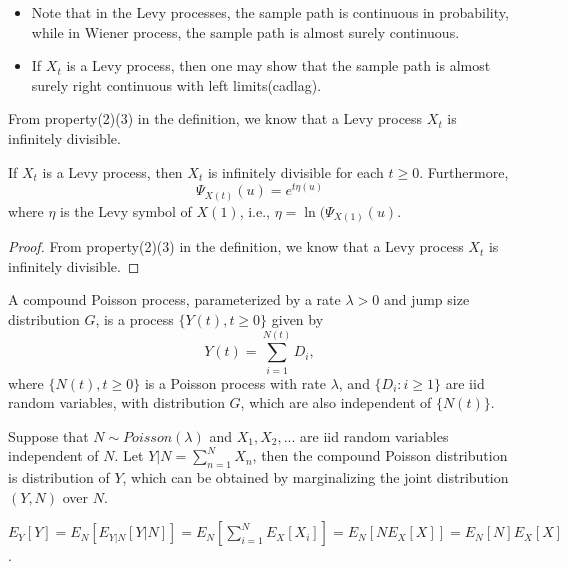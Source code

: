 \begin{refsection}
\begin{remark}\hfill
	\begin{itemize}
		\item Note that in the Levy processes, the sample path is continuous in probability, while in Wiener process, the sample path is almost surely continuous.
		\item If $X_t$ is a Levy process, then one may show that the sample path is almost surely right continuous with left limits(cadlag). 
	\end{itemize}
\end{remark}


\begin{remark}
	From property(2)(3) in the definition, we know that a Levy process $X_t$ is infinitely divisible.
\end{remark}

\begin{lemma}
	If $X_t$ is a Levy process, then $X_t$ is infinitely divisible for each $t\geq 0$. Furthermore,
	$$\Psi_{X(t)}(u) = e^{t\eta(u)}$$
	where $\eta$ is the Levy symbol of $X(1)$, i.e., $\eta = \ln(\Psi_{X(1)}(u)$.
\end{lemma}
\begin{proof}
	From property(2)(3) in the definition, we know that a Levy process $X_t$ is infinitely divisible.
\end{proof}


\begin{definition}
	A compound Poisson process, parameterized by a rate $\lambda > 0$ and jump size distribution $G$, is a process $\{Y(t),t\geq 0\}$ given by
	$$Y(t) = \sum_{i=1}^{N(t)} D_i,$$
	where $\{N(t),t\geq 0\}$ is a Poisson process with rate $\lambda$, and $\{D_i:i\geq 1\}$ are iid random variables, with distribution $G$, which are also independent of $\{N(t)\}$.
\end{definition}

\begin{definition}
	Suppose that 
	$N\sim Poisson(\lambda)$ and $X_1,X_2,...$ are iid random variables independent of $N$. Let $Y|N = \sum_{n=1}^N X_n$, then the compound Poisson distribution is distribution of $Y$, which can be obtained by marginalizing the joint distribution $(Y,N)$ over $N$. 
\end{definition}

\begin{lemma}
	$E_Y[Y] = E_N[E_{Y|N}[Y|N]] = E_N[\sum_{i=1}^N E_X[X_i]] = E_N[NE_X[X]] = E_N[N]E_X[X]$.
	

\end{lemma}
\end{refsection}
